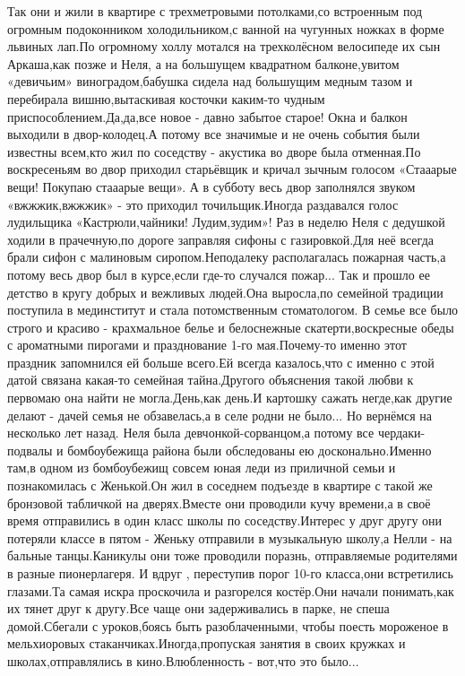Так они и жили в квартире с трехметровыми потолками,со встроенным под огромным подоконником холодильником,с ванной на чугунных ножках в форме львиных лап.По огромному холлу мотался на трехколёсном велосипеде их сын Аркаша,как позже и Неля, а на большущем квадратном балконе,увитом «девичьим» виноградом,бабушка сидела над большущим медным тазом и перебирала вишню,вытаскивая косточки каким-то чудным приспособлением.Да,да,все новое - давно забытое старое! 
Окна и балкон выходили в двор-колодец.А потому все значимые и не очень события были известны всем,кто жил по соседству - акустика во дворе была отменная.По воскресеньям во двор приходил старьёвщик и кричал зычным голосом «Стааарые вещи! Покупаю стааарые вещи». А в субботу весь двор заполнялся звуком «вжжжик,вжжжик» - это приходил точильщик.Иногда раздавался голос лудильщика «Кастрюли,чайники! Лудим,зудим»! 
Раз в неделю Неля с дедушкой ходили в прачечную,по дороге заправляя сифоны с газировкой.Для неё всегда брали сифон с малиновым сиропом.Неподалеку располагалась пожарная часть,а потому весь двор был в курсе,если где-то случался пожар...
Так и прошло ее детство в кругу добрых и вежливых людей.Она выросла,по семейной традиции поступила в мединститут и стала потомственным стоматологом.
В семье все было строго и красиво - крахмальное белье и белоснежные скатерти,воскресные обеды с ароматными пирогами и празднование 1-го мая.Почему-то именно этот праздник запомнился ей больше всего.Ей всегда казалось,что с именно с этой датой связана какая-то семейная тайна.Другого объяснения такой любви к первомаю она найти не могла.День,как день.И картошку сажать негде,как другие делают - дачей семья не обзавелась,а в селе родни не было...
Но вернёмся на несколько лет назад.
Неля была девчонкой-сорванцом,а потому все чердаки-подвалы и бомбоубежища района были обследованы ею досконально.Именно там,в одном из бомбоубежищ совсем юная леди из приличной семьи и познакомилась с Женькой.Он жил в соседнем подъезде в квартире с такой же бронзовой табличкой на дверях.Вместе они проводили кучу времени,а в своё время отправились в один класс школы по соседству.Интерес у друг другу они потеряли классе в пятом - Женьку отправили в музыкальную школу,а Нелли - на бальные танцы.Каникулы они тоже проводили поразнь, отправляемые родителями в разные пионерлагеря.
И вдруг , переступив порог 10-го класса,они встретились глазами.Та самая искра проскочила и разгорелся костёр.Они начали понимать,как их тянет друг к другу.Все чаще они задерживались в парке, не спеша домой.Сбегали с уроков,боясь быть разоблаченными, чтобы поесть мороженое в мельхиоровых стаканчиках.Иногда,пропуская занятия в своих кружках и школах,отправлялись в кино.Влюбленность - вот,что это было...
